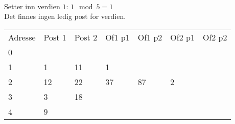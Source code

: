 \documentclass[a4paper, 12pt] {article}
\begin{document}
~\\
Setter inn verdien $1$: $1 \mod 5 = 1$\\
Det finnes ingen ledig post for verdien.\\
\begin{tabular}{|l|l|l|l|l|l|l|}
    \hline
    Adresse & Post 1 & Post 2 & Of1 p1 & Of1 p2 & Of2 p1 & Of2 p2 \\
    0       & ~      & ~      & ~      & ~      & ~      & ~      \\
    1       & 1      & 11     & 1      & ~      & ~      & ~      \\
    2       & 12     & 22     & 37     & 87     & 2      & ~      \\
    3       & 3      & 18     & ~      & ~      & ~      & ~      \\
    4       & 9      & ~      & ~      & ~      & ~      & ~      \\ \hline
\end{tabular}
\end{document}
